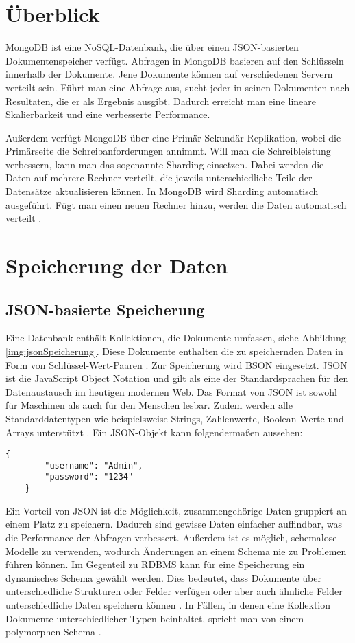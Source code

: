 \section{Überblick}
MongoDB ist eine NoSQL-Datenbank, die über einen JSON-basierten Dokumentenspeicher verfügt. Abfragen in MongoDB basieren auf den Schlüsseln innerhalb der Dokumente. Jene Dokumente können auf verschiedenen Servern verteilt sein. Führt man eine Abfrage aus, sucht jeder in seinen Dokumenten nach Resultaten, die er als Ergebnis ausgibt. Dadurch erreicht man eine lineare Skalierbarkeit und eine verbesserte Performance. 

Außerdem verfügt MongoDB über eine Primär-Sekundär-Replikation, wobei die Primärseite die Schreibanforderungen annimmt. Will man die Schreibleistung verbessern, kann man das sogenannte Sharding einsetzen. Dabei werden die Daten auf mehrere Rechner verteilt, die jeweils unterschiedliche Teile der Datensätze aktualisieren können. In MongoDB wird Sharding automatisch ausgeführt. Fügt man einen neuen Rechner hinzu, werden die Daten automatisch verteilt \cite[S.26]{zwei}.

\section{Speicherung der Daten}
\subsection{JSON-basierte Speicherung}
Eine Datenbank enthält Kollektionen, die Dokumente umfassen, siehe Abbildung \ref*{img:jsonSpeicherung}. Diese Dokumente enthalten die zu speichernden Daten \cite[S.30]{zwei} in Form von Schlüssel-Wert-Paaren \cite[S.27]{zwei}. Zur Speicherung wird \ac{BSON} eingesetzt. JSON ist die JavaScript Object Notation und gilt als eine der Standardsprachen für den Datenaustausch im heutigen modernen Web. Das Format von JSON ist sowohl für Maschinen als auch für den Menschen lesbar. Zudem werden alle Standarddatentypen wie beispielsweise Strings, Zahlenwerte, Boolean-Werte und Arrays unterstützt \cite[S.31]{zwei}. Ein JSON-Objekt kann folgendermaßen aussehen:

\begin{lstlisting}[caption=JSON-Objekt, label=lst:jsonobjekt,float=!htb]
    {
        "username": "Admin",
        "password": "1234"
    }
\end{lstlisting}

Ein Vorteil von JSON ist die Möglichkeit, zusammengehörige Daten gruppiert an einem Platz zu speichern. Dadurch sind gewisse Daten einfacher auffindbar, was die Performance der Abfragen verbessert. Außerdem ist es möglich, schemalose Modelle zu verwenden, wodurch Änderungen an einem Schema nie zu Problemen führen können.
Im Gegenteil zu RDBMS kann für eine Speicherung ein dynamisches Schema gewählt werden. Dies bedeutet, dass Dokumente über unterschiedliche Strukturen oder Felder verfügen oder aber auch ähnliche Felder unterschiedliche Daten speichern können \cite[S.26f.]{zwei}. In Fällen, in denen eine Kollektion Dokumente unterschiedlicher Typen beinhaltet, spricht man von einem polymorphen Schema \cite[S.32]{zwei}.

